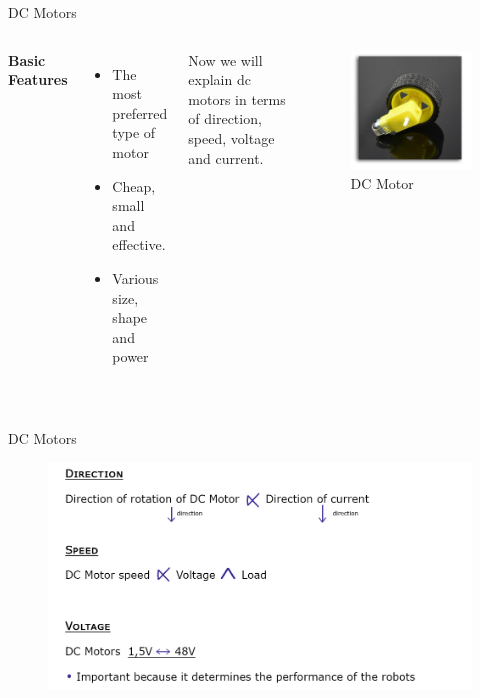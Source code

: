 \documentclass[xcolor=table, 9pt]{beamer}
\begin{document}


\begin{frame}{DC Motors}
\begin{columns}[c] 
\textbf{Basic Features}\\~\\
\begin{itemize}
\item The most preferred type of motor
\item Cheap, small and effective. 
\item Various size, shape and power\\~\\ 
\end{itemize}
Now we will explain dc motors in terms of direction, speed, voltage and current.
\begin{figure}
\includegraphics[width=0.85\linewidth]{dcmotor.png}
\caption{DC Motor}
\end{figure}
\end{columns}
\end{frame}



\begin{frame}{DC Motors}
\begin{figure}
\includegraphics[width=0.9\linewidth]{dsv.png}
\end{figure}
\end{frame}
\end{document}
